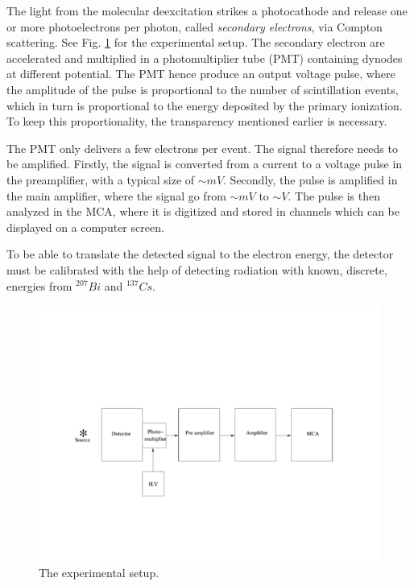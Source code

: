 \documentclass[a4,11pt, notitlepage]{article}
\begin{document}
The light from the molecular deexcitation strikes a photocathode and
release one or more photoelectrons per photon, called
\textit{secondary electrons}, via Compton scattering. See
Fig. \ref{fig:setup} for the experimental setup. The secondary
electron are accelerated and multiplied in a photomultiplier tube
(PMT) containing dynodes at different potential. The PMT hence produce
an output voltage pulse, where the amplitude of the pulse is
proportional to the number of scintillation events, which in turn is
proportional to the energy deposited by the primary ionization. To
keep this proportionality, the transparency mentioned earlier is
necessary.

The PMT only delivers a few electrons per event. The signal therefore
needs to be amplified. Firstly, the signal is converted from a current
to a voltage pulse in the preamplifier, with a typical size of
$\sim mV$. Secondly, the pulse is amplified in the main amplifier,
where the signal go from $\sim mV$ to $\sim V$. The pulse is then
analyzed in the MCA, where it is digitized and stored in channels which
can be displayed on a computer screen.

To be able to translate the detected signal to the electron energy,
the detector must be calibrated with the help of detecting radiation
with known, discrete, energies from $^{207}Bi$ and $^{137}Cs$.

\begin{figure}[htp]
  \vspace{40pt}
  \begin{center}
    \includegraphics[width=15.0cm]{figures/Setup.png}
    \caption{The experimental setup.}
\label{fig:setup}
  \end{center}
\end{figure}
\end{document}
